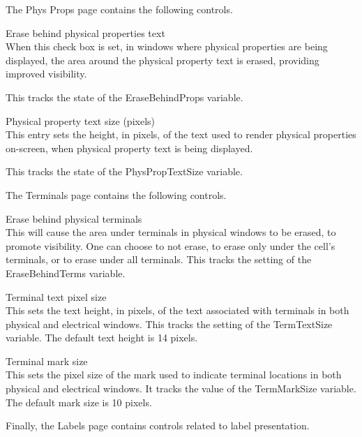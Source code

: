 The {\cb Phys Props} page contains the following controls.

\begin{description}
\item{\cb Erase behind physical properties text}\\
When this check box is set, in windows where physical properties are
being displayed, the area around the physical property text is erased,
providing improved visibility.

This tracks the state of the {\et EraseBehindProps} variable.

\item{\cb Physical property text size (pixels)}\\
This entry sets the height, in pixels, of the text used to render
physical properties on-screen, when physical property text is being
displayed.

This tracks the state of the {\et PhysPropTextSize} variable.
\end{description}

The {\cb Terminals} page contains the following controls.

\begin{description}
\item{\cb Erase behind physical terminals}\\
This will cause the area under terminals in physical windows to be
erased, to promote visibility.  One can choose to not erase, to erase
only under the cell's terminals, or to erase under all terminals. 
This tracks the setting of the {\et EraseBehindTerms} variable.

\item{\cb Terminal text pixel size}\\
This sets the text height, in pixels, of the text associated with
terminals in both physical and electrical windows.  This tracks the
setting of the {\et TermTextSize} variable.  The default text height
is 14 pixels.

\item{\cb Terminal mark size}\\
This sets the pixel size of the mark used to indicate terminal
locations in both physical and electrical windows.  It tracks the
value of the {\et TermMarkSize} variable.  The default mark size is 10
pixels.
\end{description}

Finally, the {\cb Labels} page contains controls related to label
presentation.

